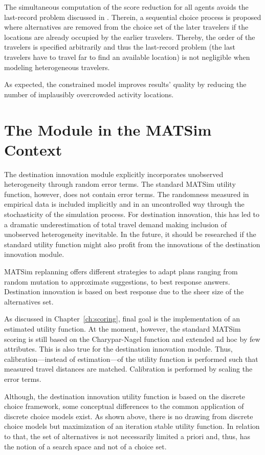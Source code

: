 The simultaneous computation of the score reduction for all agents avoids the last-record problem discussed in \citet[][]{VovshaEtAl_TRR_2002}. Therein, a sequential choice process is proposed where alternatives are removed from the choice set of the later travelers if the locations are already occupied by the earlier travelers. Thereby, the order of the travelers is specified arbitrarily and thus the last-record problem (the last travelers have to travel far to find an available location) is not negligible when modeling heterogeneous travelers. 

As expected, the constrained model improves results' quality by reducing the number of implausibly overcrowded activity locations.

\section{The Module in the MATSim Context}
The destination innovation module explicitly incorporates unobserved heterogeneity through random error terms. The standard MATSim utility function, however, does not contain error terms. The randomness measured in empirical data is included implicitly and in an uncontrolled way through the stochasticity of the simulation process. For destination innovation, this has led to a dramatic underestimation of total travel demand making inclusion of unobserved heterogeneity inevitable. In the future, it should be researched if the standard utility function might also profit from the innovations of the destination innovation module.

MATSim replanning offers different strategies to adapt plans ranging from random mutation to approximate suggestions, to best response answers. Destination innovation is based on best response due to the sheer size of the alternatives set. 

As discussed in Chapter~\ref{ch:scoring}, final goal is the implementation of an estimated utility function. At the moment, however, the standard MATSim scoring is still based on the Charypar-Nagel function and extended ad hoc by few attributes. This is also true for the destination innovation module. Thus, calibration---instead of estimation---of the utility function is performed such that measured travel distances are matched. Calibration is performed by scaling the error terms. 

Although, the destination innovation utility function is based on the discrete choice framework, some conceptual differences to the common application of discrete choice models exist. As shown above, there is no drawing from discrete choice models but maximization of an iteration stable utility function. In relation to that, the set of alternatives is not necessarily limited a priori and, thus, has the notion of a search space and not of a choice set.

